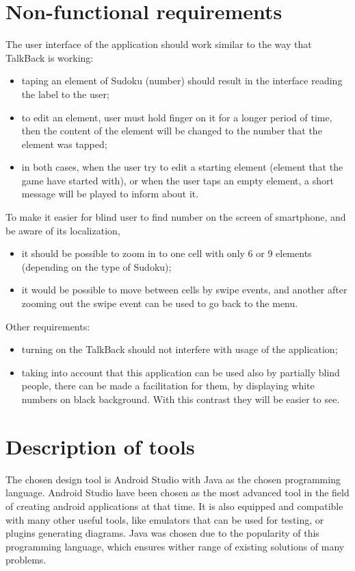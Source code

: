 \documentclass[a4paper,twoside,12pt]{book}
\begin{document}
\section{Non-functional requirements}
\par
The user interface of the application should work similar to the way that TalkBack is working: 
\begin{itemize}
\item taping an element of Sudoku (number) should result in the interface reading the label to the user;
\item to edit an element, user must hold finger on it for a longer period of time, then the content of the element will be changed to the number that the element was tapped;
\item in both cases, when the user try to edit a starting element (element that the game have started with), or when the user taps an empty element, a short message will be played to inform about it.
\end{itemize}
\par
To make it easier for blind user to find number on the screen of smartphone, and be aware of its localization,
\begin{itemize}
\item it should be possible to zoom in to one cell with only 6 or 9 elements (depending on the type of Sudoku);
\item it would be possible to move between cells by swipe events, and another after zooming out the swipe event can be used to go back to the menu.
\end{itemize}
\par
Other requirements:
\begin{itemize}
\item turning on the TalkBack should not interfere with usage of the application;
\item taking into account that this application can be used also by partially blind people, there can be made a facilitation for them, by displaying white numbers on black background. With this contrast they will be easier to see.
\end{itemize}

\section {Description of tools}%

\par The chosen design tool is Android Studio with Java as the chosen programming language. Android Studio have been chosen as the most advanced tool in the field of creating android applications at that time. It is also equipped and compatible with many other useful tools, like emulators that can be used for testing, or plugins generating diagrams. Java was chosen due to the popularity of this programming language, which ensures wither range of existing solutions of many problems.
\end{document}
